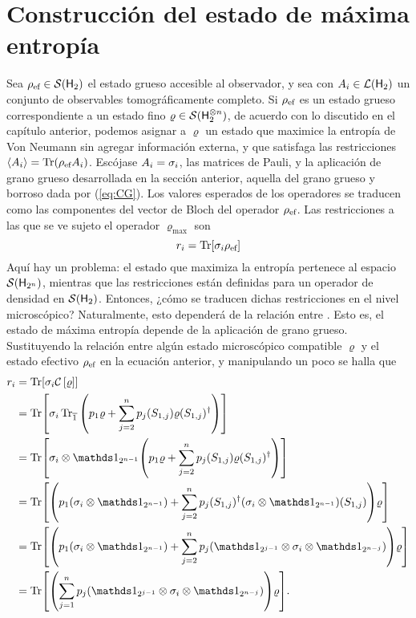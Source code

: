\section{Construcción del estado de máxima entropía}

Sea $\rho_{\text{ef}}\in\mathcal{S}({\sf H}_{2})$ el estado grueso accesible al observador, y sea  con $A_{i}\in\mathcal{L}({\sf H}_{2})$ un conjunto de observables tomográficamente completo.
Si $\rho_{\text{ef}}$ es un estado grueso correspondiente a un estado fino $\varrho\in\mathcal{S}({\sf H}_{2}^{\otimes n})$, de acuerdo con lo discutido en el capítulo anterior, podemos asignar a $\varrho$ un estado que maximice la entropía de Von Neumann sin agregar  {información externa, y que satisfaga las restricciones $\expval{A_{i}}=\Tr(\rho_{\text{ef}} A_{i})$}.
Escójase ${A_{i}}={\sigma_{i}}$, las matrices de Pauli, y la aplicación de grano grueso desarrollada en la sección anterior, aquella del grano grueso y borroso dada por (\ref{eq:CG}). Los valores esperados de los operadores se traducen como las componentes del vector de Bloch del operador $\rho_{\text{ef}}$. Las restricciones a las que se ve sujeto el operador $\varrho_{\max}$ son
\begin{equation*}
    r_{i}=\Tr[\sigma_{i}\rho_{\text{ef}}]
\end{equation*}
Aquí hay un problema: el estado que maximiza la entropía pertenece al espacio $\mathcal{S}({\sf H}_{2^{n}})$, mientras que las restricciones están definidas para un operador de densidad en $\mathcal{S}({\sf H}_{2})$. Entonces, ¿cómo se traducen dichas restricciones en el nivel microscópico? Naturalmente, esto dependerá de la relación entre . Esto es, el estado de máxima entropía depende de la aplicación de grano grueso. Sustituyendo la relación entre algún estado microscópico compatible $\varrho$ y el estado efectivo $\rho_{\text{ef}}$ en la ecuación anterior, y manipulando un poco se halla que
\begin{align*}
    r_{i}&=\Tr[\sigma_{i}\CG{\varrho}]\\
    &=\Tr[\sigma_{i}\Tr_{\overline{1}}\qty(p_{1}\varrho+\sum_{j=2}^{n}p_{j}(S_{1,j})\varrho(S_{1,j})^{\dagger})]\\
    &=\Tr[\sigma_{i}\otimes\Id_{2^{n-1}}\qty(p_{1}\varrho+\sum_{j=2}^{n}p_{j}(S_{1,j})\varrho(S_{1,j})^{\dagger})]\\
    &=\Tr[\qty(p_{1}(\sigma_{i}\otimes\Id_{2^{n-1}})+\sum_{j=2}^{n}p_{j}(S_{1,j})^{\dagger}(\sigma_{i}\otimes\Id_{2^{n-1}})(S_{1,j}))\varrho]\\
    &=\Tr[\qty(p_{1}(\sigma_{i}\otimes\Id_{2^{n-1}})+\sum_{j=2}^{n}p_{j}(\Id_{2^{j-1}}\otimes\sigma_{i}\otimes\Id_{2^{n-j}}))\varrho]\\
    &=\Tr[\qty(\sum_{j=1}^{n}p_{j}(\Id_{2^{j-1}}\otimes\sigma_{i}\otimes\Id_{2^{n-j}}))\varrho].
\end{align*}
